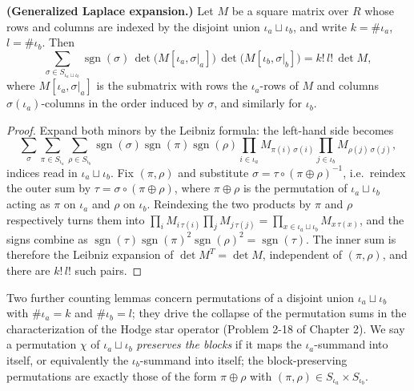\begin{proposition}
\label{lem:laplace-expansion-block}
\leanok
\textbf{(Generalized Laplace expansion.)} Let $M$ be a square matrix over $R$ whose rows and columns are indexed by the disjoint union $\iota_a \sqcup \iota_b$, and write $k = \#\iota_a$, $l = \#\iota_b$. Then
\[
\sum_{\sigma \in S_{\iota_a \sqcup \iota_b}} \operatorname{sgn}(\sigma)\, \det\big(M[\iota_a, \sigma|_a]\big)\, \det\big(M[\iota_b, \sigma|_b]\big) = k!\, l!\, \det M,
\]
where $M[\iota_a, \sigma|_a]$ is the submatrix with rows the $\iota_a$-rows of $M$ and columns $\sigma(\iota_a)$-columns in the order induced by $\sigma$, and similarly for $\iota_b$.
\end{proposition}
\begin{proof}
\leanok
Expand both minors by the Leibniz formula: the left-hand side becomes
\[
\sum_{\sigma} \sum_{\pi \in S_{\iota_a}} \sum_{\rho \in S_{\iota_b}} \operatorname{sgn}(\sigma)\operatorname{sgn}(\pi)\operatorname{sgn}(\rho) \prod_{i \in \iota_a} M_{\pi(i)\, \sigma(i)} \prod_{j \in \iota_b} M_{\rho(j)\, \sigma(j)},
\]
indices read in $\iota_a \sqcup \iota_b$. Fix $(\pi, \rho)$ and substitute $\sigma = \tau \circ (\pi \oplus \rho)^{-1}$, i.e.\ reindex the outer sum by $\tau = \sigma \circ (\pi \oplus \rho)$, where $\pi \oplus \rho$ is the permutation of $\iota_a \sqcup \iota_b$ acting as $\pi$ on $\iota_a$ and $\rho$ on $\iota_b$. Reindexing the two products by $\pi$ and $\rho$ respectively turns them into $\prod_{i} M_{i\,\tau(i)} \prod_{j} M_{j\,\tau(j)} = \prod_{x \in \iota_a \sqcup \iota_b} M_{x\,\tau(x)}$, and the signs combine as $\operatorname{sgn}(\tau)\operatorname{sgn}(\pi)^2\operatorname{sgn}(\rho)^2 = \operatorname{sgn}(\tau)$. The inner sum is therefore the Leibniz expansion of $\det M^{T} = \det M$, independent of $(\pi, \rho)$, and there are $k!\,l!$ such pairs.
\end{proof}

Two further counting lemmas concern permutations of a disjoint union $\iota_a \sqcup \iota_b$ with $\#\iota_a = k$ and $\#\iota_b = l$; they drive the collapse of the permutation sums in the characterization of the Hodge star operator (Problem 2-18 of Chapter 2). We say a permutation $\chi$ of $\iota_a \sqcup \iota_b$ \emph{preserves the blocks} if it maps the $\iota_a$-summand into itself, or equivalently the $\iota_b$-summand into itself; the block-preserving permutations are exactly those of the form $\pi \oplus \rho$ with $(\pi, \rho) \in S_{\iota_a} \times S_{\iota_b}$.

